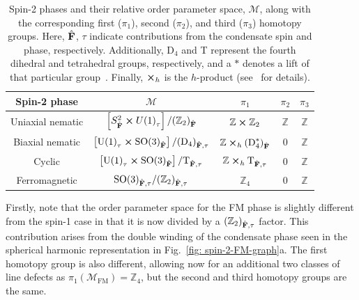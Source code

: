 \begin{table}
    \centering
    \begin{tabular}{ccccc}
        \toprule
        Spin-2 phase & \(\mathcal{M}\) & \(\pi_1\) & \(\pi_2\) & \(\pi_3\) \\
        \midrule
        Uniaxial nematic & \(\left[S^2_{\hat{\vb{F}}} \cross {U(1)}_\tau\right]
        / {({\mathbb{Z}}_2)}_{\hat{\vb{F}}} \)
        & \(\mathbb{Z} \cross \mathbb{Z}_2\)
        & \(\mathbb{Z}\) & \(\mathbb{Z} \) \\
        Biaxial nematic & \(\left[{\text{U}(1)}_\tau \cross
        {\text{SO}(3)}_{\hat{\vb{F}}}\right]
        / {(\text{D}_4)}_{\hat{\vb{F}}, \tau}\)
        & \(\mathbb{Z} \cross_h {(\text{D}^\ast_4)}_{\hat{\vb{F}}}\) & 0
        & \(\mathbb{Z}\) \\
        Cyclic & \(\left[{\text{U}(1)}_\tau
        \cross {\text{SO}(3)}_{\hat{\vb{F}}}\right]
        / \text{T}_{\hat{\vb{F}}, \tau}\)
        & \(\mathbb{Z} \cross_h \text{T}_{\hat{\vb{F}}, \tau}\) & 0
        & \(\mathbb{Z}\) \\
        Ferromagnetic & \({\text{SO}(3)}_{\hat{\vb{F}}, \tau}
        / {({\mathbb{Z}}_2)}_{\hat{\vb{F}}, \tau}\)
        & \({\mathbb{Z}}_4\) & 0 & \(\mathbb{Z}\) \\
        \bottomrule
    \end{tabular}
    \caption[Order parameter spaces and first three homotopy groups for spin-2
    BECs]{\label{tab: spin-2-homotopy-groups}Spin-2 phases and their relative
    order parameter space, \(\mathcal{M}\), along with the corresponding first
    (\(\pi_1\)), second (\(\pi_2\)), and third (\(\pi_3\)) homotopy groups.
    Here, \(\hat{\vb{F}}\), \(\tau \) indicate contributions from the
    condensate spin and phase, respectively.
    Additionally, \(\text{D}_4\) and T represent the fourth dihedral and
    tetrahedral groups, respectively, and a \(\ast \) denotes a lift of that
    particular group~\cite{Mermin1979}.
    Finally, \(\cross_h\) is the \(h\)-product (see~\cite{Kobayashi2012} for
    details).}
\end{table}

Firstly, note that the order parameter space for the FM phase is slightly
different from the spin-1 case in that it is now divided by a
\({(\mathbb{Z}_2)}_{\hat{\vb{F}}, \tau}\) factor.
This contribution arises from the double winding of the condensate phase seen in
the spherical harmonic representation in Fig.~\ref{fig: spin-2-FM-graph}a.
The first homotopy group is also different, allowing now for an additional two
classes of line defects as \(\pi_1(\mathcal{M}_\text{FM}) = \mathbb{Z}_4\), but
the second and third homotopy groups are the same.

